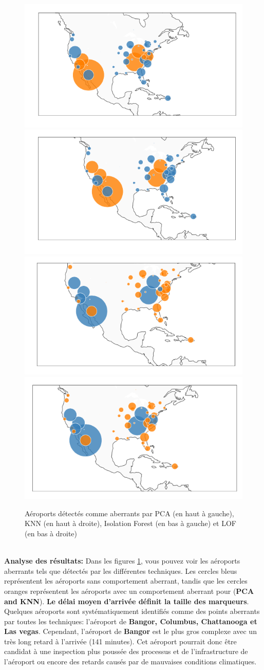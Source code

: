 \begin{figure}[t]
    \centering
    \includegraphics[width=.45\textwidth]{ADOA/Images/vol1PCA.png}
    \includegraphics[width=.450\textwidth]{ADOA/Images/vols1KNN.png}\\
    \includegraphics[width=.45\textwidth]{ADOA/Images/volsIsoFor.png}
    \includegraphics[width=.450\textwidth]{ADOA/Images/volsLOFpng.png}
    \caption{Aéroports détectés comme aberrants par PCA (en haut à gauche), KNN (en haut à droite), Isolation Forest (en bas à gauche) et LOF (en bas à droite)}%
    \label{fig21}
\end{figure}\\
\textbf{Analyse des résultats:} 
Dans les figures \ref{fig21}, vous pouvez voir les aéroports aberrants tels que détectés par les différentes techniques. Les cercles bleus représentent les aéroports sans comportement aberrant, tandis que les cercles oranges représentent les aéroports avec un comportement aberrant pour (\textbf{PCA and KNN}). \textbf{Le délai moyen d'arrivée définit la taille des marqueurs}. Quelques aéroports sont systématiquement identifiés comme des points aberrants par toutes les techniques: l’aéroport de \textbf{Bangor, Columbus, Chattanooga et Las vegas}. Cependant, l’aéroport de \textbf{Bangor} est le plus gros complexe avec un très long retard à l’arrivée (141 minutes). Cet aéroport pourrait donc être candidat à une inspection plus poussée des processus et de l’infrastructure de l’aéroport ou encore des retards causés par de mauvaises conditions climatiques.\newl
